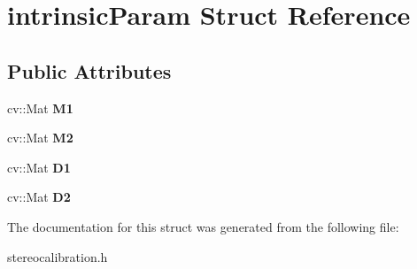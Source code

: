 \hypertarget{structintrinsic_param}{}\section{intrinsic\+Param Struct Reference}
\label{structintrinsic_param}
\subsection*{Public Attributes}
\begin{DoxyCompactItemize}
\item 
\mbox{\label{structintrinsic_param_afa1883a327ac6a8c7aeece43fc848694}} 
cv\+::\+Mat {\bfseries M1}
\item 
\mbox{\label{structintrinsic_param_ab3769f092f01950cec0370c224f2b9dc}} 
cv\+::\+Mat {\bfseries M2}
\item 
\mbox{\label{structintrinsic_param_a8aaa38222f944701110adecc515b1ee8}} 
cv\+::\+Mat {\bfseries D1}
\item 
\mbox{\label{structintrinsic_param_aeeacee1322eebeb2c6b9401e7bb5e345}} 
cv\+::\+Mat {\bfseries D2}
\end{DoxyCompactItemize}


The documentation for this struct was generated from the following file\+:\begin{DoxyCompactItemize}
\item 
stereocalibration.\+h\end{DoxyCompactItemize}
